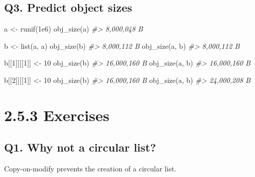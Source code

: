 \documentclass[
]{book}
\newenvironment{Shaded}{\begin{snugshade}}{\end{snugshade}}
\newcommand{\CommentTok}[1]{\textcolor[rgb]{0.56,0.35,0.01}{\textit{#1}}}
\newcommand{\DecValTok}[1]{\textcolor[rgb]{0.00,0.00,0.81}{#1}}
\newcommand{\FloatTok}[1]{\textcolor[rgb]{0.00,0.00,0.81}{#1}}
\newcommand{\FunctionTok}[1]{\textcolor[rgb]{0.00,0.00,0.00}{#1}}
\newcommand{\NormalTok}[1]{#1}
\newcommand{\OtherTok}[1]{\textcolor[rgb]{0.56,0.35,0.01}{#1}}
\begin{document}
\hypertarget{q3.-predict-object-sizes}{%
\subsection*{Q3. Predict object sizes}\label{q3.-predict-object-sizes}}

\begin{Shaded}
\begin{Highlighting}[]
\NormalTok{a }\OtherTok{\textless{}{-}} \FunctionTok{runif}\NormalTok{(}\FloatTok{1e6}\NormalTok{)}
\FunctionTok{obj\_size}\NormalTok{(a)}
\CommentTok{\#\textgreater{} 8,000,048 B}

\NormalTok{b }\OtherTok{\textless{}{-}} \FunctionTok{list}\NormalTok{(a, a)}
\FunctionTok{obj\_size}\NormalTok{(b)}
\CommentTok{\#\textgreater{} 8,000,112 B}
\FunctionTok{obj\_size}\NormalTok{(a, b)}
\CommentTok{\#\textgreater{} 8,000,112 B}

\NormalTok{b[[}\DecValTok{1}\NormalTok{]][[}\DecValTok{1}\NormalTok{]] }\OtherTok{\textless{}{-}} \DecValTok{10}
\FunctionTok{obj\_size}\NormalTok{(b)}
\CommentTok{\#\textgreater{} 16,000,160 B}
\FunctionTok{obj\_size}\NormalTok{(a, b)}
\CommentTok{\#\textgreater{} 16,000,160 B}

\NormalTok{b[[}\DecValTok{2}\NormalTok{]][[}\DecValTok{1}\NormalTok{]] }\OtherTok{\textless{}{-}} \DecValTok{10}
\FunctionTok{obj\_size}\NormalTok{(b)}
\CommentTok{\#\textgreater{} 16,000,160 B}
\FunctionTok{obj\_size}\NormalTok{(a, b)}
\CommentTok{\#\textgreater{} 24,000,208 B}
\end{Highlighting}
\end{Shaded}

\hypertarget{exercises-3}{%
\section{2.5.3 Exercises}\label{exercises-3}}

\hypertarget{q1.-why-not-a-circular-list}{%
\subsection*{Q1. Why not a circular list?}\label{q1.-why-not-a-circular-list}}

Copy-on-modify prevents the creation of a circular list.
\end{document}
